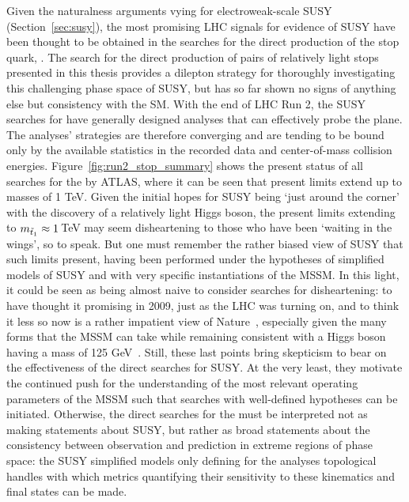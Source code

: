 Given the naturalness arguments vying for electroweak-scale SUSY (Section~\ref{sec:susy}),
the most promising LHC signals for evidence of SUSY have been thought to be obtained in the searches for the direct production
of the stop quark, \stopone.
The search for the direct production of pairs of relatively light stops presented in this thesis provides a dilepton
strategy for thoroughly investigating this challenging phase space of SUSY, but has so far shown no signs of anything else
but consistency with the SM.
With the end of LHC Run 2, the SUSY searches for \stopone have generally designed analyses that can effectively
probe the \msn plane.
The analyses' strategies are therefore converging and are tending to be bound only by the available statistics
in the recorded data and center-of-mass collision energies.
Figure~\ref{fig:run2_stop_summary} shows the present status of all searches for the \stopone by ATLAS,
where it can be seen that present limits extend up to \stopone masses of 1 TeV.
Given the initial hopes for SUSY being `just around the corner' with the discovery of a relatively light Higgs boson,
the present limits extending to $m_{\tilde{t}_1} \approx 1$\,TeV may seem disheartening to those who
have been `waiting in the wings', so to speak.
But one must remember the rather biased view of SUSY that such limits present, having been performed
under the hypotheses of simplified models of SUSY and with very specific instantiations of the MSSM.
In this light, it could be seen as being almost naive to consider searches for \stopone disheartening:
to have thought it promising in 2009, just as the LHC was turning on, and to think it less so now
is a rather impatient view of Nature~\cite{FengNaturalness}, especially given the many forms that the MSSM
can take while remaining consistent with a Higgs boson having a mass of 125 GeV~\cite{SUSYPrimer}.
Still, these last points bring skepticism to bear on the effectiveness of the direct searches for SUSY.
At the very least, they motivate the continued push for the understanding of the most relevant
operating parameters of the MSSM such that searches with well-defined hypotheses can
be initiated.
Otherwise, the direct searches for the \stopone must be interpreted not as making statements
about SUSY, but rather as broad statements about the consistency between observation and prediction in extreme regions of phase space:
the SUSY simplified models only defining for the analyses topological handles with which metrics
quantifying their sensitivity to these kinematics and final states can be made.

